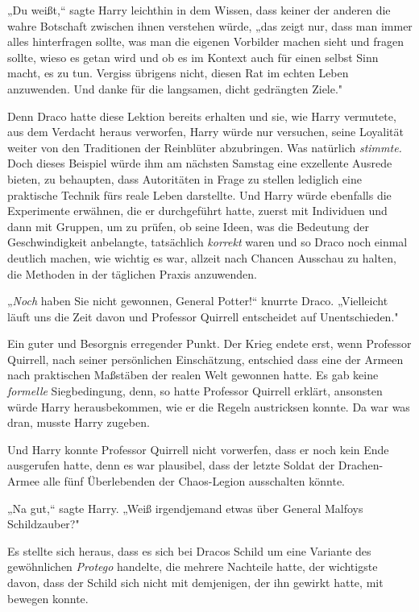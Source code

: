 {„Du weißt,“ sagte Harry leichthin in dem Wissen, dass keiner der anderen die wahre Botschaft zwischen ihnen verstehen würde, „das zeigt nur, dass man immer alles hinterfragen sollte, was man die eigenen Vorbilder machen sieht und fragen sollte, wieso es getan wird und ob es im Kontext auch für einen selbst Sinn macht, es zu tun. Vergiss übrigens nicht, diesen Rat im echten Leben anzuwenden. Und danke für die langsamen, dicht gedrängten Ziele."

Denn Draco hatte diese Lektion bereits erhalten und sie, wie Harry vermutete, aus dem Verdacht heraus verworfen, Harry würde nur versuchen, seine Loyalität weiter von den Traditionen der Reinblüter abzubringen. Was natürlich \emph{stimmte.} Doch dieses Beispiel würde ihm am nächsten Samstag eine exzellente Ausrede bieten, zu behaupten, dass Autoritäten in Frage zu stellen lediglich eine praktische Technik fürs reale Leben darstellte. Und Harry würde ebenfalls die Experimente erwähnen, die er durchgeführt hatte, zuerst mit Individuen und dann mit Gruppen, um zu prüfen, ob seine Ideen, was die Bedeutung der Geschwindigkeit anbelangte, tatsächlich \emph{korrekt} waren und so Draco noch einmal deutlich machen, wie wichtig es war, allzeit nach Chancen Ausschau zu halten, die Methoden in der täglichen Praxis anzuwenden.

„\emph{Noch} haben Sie nicht gewonnen, General Potter!“ knurrte Draco. „Vielleicht läuft uns die Zeit davon und Professor Quirrell entscheidet auf Unentschieden."

Ein guter und Besorgnis erregender Punkt. Der Krieg endete erst, wenn Professor Quirrell, nach seiner persönlichen Einschätzung, entschied dass eine der Armeen nach praktischen Maßstäben der realen Welt gewonnen hatte. Es gab keine \emph{formelle} Siegbedingung, denn, so hatte Professor Quirrell erklärt, ansonsten würde Harry herausbekommen, wie er die Regeln austricksen konnte. Da war was dran, musste Harry zugeben.

Und Harry konnte Professor Quirrell nicht vorwerfen, dass er noch kein Ende ausgerufen hatte, denn es war plausibel, dass der letzte Soldat der Drachen-Armee alle fünf Überlebenden der Chaos-Legion ausschalten könnte.

„Na gut,“ sagte Harry. „Weiß irgendjemand etwas über General Malfoys Schildzauber?"

Es stellte sich heraus, dass es sich bei Dracos Schild um eine Variante des gewöhnlichen \emph{Protego} handelte, die mehrere Nachteile hatte, der wichtigste davon, dass der Schild sich nicht mit demjenigen, der ihn gewirkt hatte, mit bewegen konnte.

}
